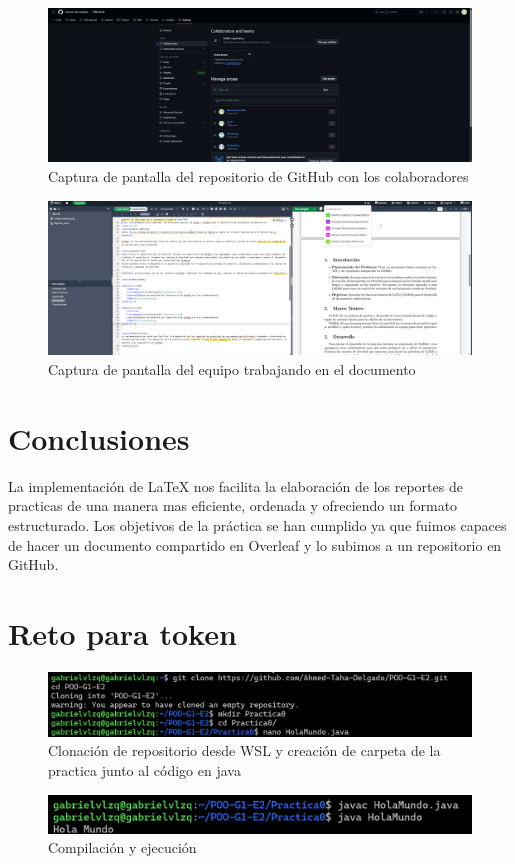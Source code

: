 \documentclass[letterpaper,12pt]{article}
\begin{document}
\begin{figure}[H]
    \centering
    \includegraphics[width=14cm]{Colaboradores.png}
    \caption{Captura de pantalla del repositorio de GitHub con los colaboradores}
    \label{fig:colaboradores}
\end{figure}


\begin{figure}[H]
    \centering
    \includegraphics[width=14cm]{Edicion.png}
    \caption{Captura de pantalla del equipo trabajando en el documento}
    \label{fig:colaboradores}
\end{figure}



\section{Conclusiones}
La implementación de LaTeX nos facilita la elaboración de los reportes de practicas de una manera mas eficiente, ordenada y ofreciendo un formato estructurado. Los objetivos de la práctica se han cumplido ya que fuimos capaces de hacer un documento compartido en Overleaf y lo subimos a un repositorio en GitHub.

\section{Reto para token}


\begin{figure}[H]
    \centering
    \includegraphics[width=14cm]{clonacion.png}
    \caption{Clonación de repositorio desde WSL y creación de carpeta de la practica junto al código en java}
    \label{fig:colaboradores}
\end{figure}

\begin{figure}[H]
    \centering
    \includegraphics[width=14cm]{compilacion.png}
    \caption{Compilación y ejecución}
    \label{fig:colaboradores}
\end{figure}
\end{document}
